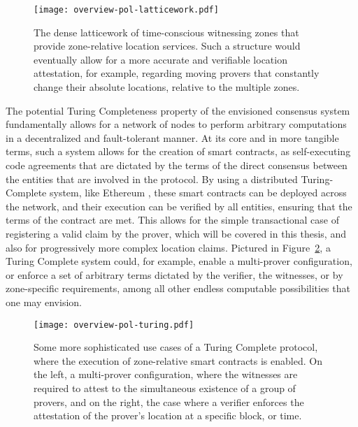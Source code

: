 \begin{figure}[ht]
    \begin{center}
    \texttt{[image: overview-pol-latticework.pdf]}
    \caption{The dense latticework of time-conscious witnessing zones that provide zone-relative location services. Such a structure would eventually allow for a more accurate and verifiable location attestation, for example, regarding moving provers that constantly change their absolute locations, relative to the multiple zones.}
    \label{fig:proof-of-location-overview-latticework}
    \end{center}
\end{figure}

The potential Turing Completeness property of the envisioned consensus system fundamentally allows for a network of nodes to perform arbitrary computations in a decentralized and fault-tolerant manner. At its core and in more tangible terms, such a system allows for the creation of smart contracts, as self-executing code agreements that are dictated by the terms of the direct consensus between the entities that are involved in the \pol{} protocol. By using a distributed Turing-Complete system, like Ethereum \cite{buterin2014next}, these smart contracts can be deployed across the network, and their execution can be verified by all entities, ensuring that the terms of the contract are met. This allows for the simple transactional case of registering a valid \pol{} claim by the prover, which will be covered in this thesis, and also for progressively more complex location claims. Pictured in Figure~\ref{fig:proof-of-location-overview-turing}, a Turing Complete system could, for example, enable a multi-prover configuration, or enforce a set of arbitrary terms dictated by the verifier, the witnesses, or by zone-specific requirements, among all other endless computable possibilities that one may envision. 

\begin{figure}[ht]
    \begin{center}
    \texttt{[image: overview-pol-turing.pdf]}
    \caption{Some more sophisticated use cases of a Turing Complete \pol{} protocol, where the execution of zone-relative smart contracts is enabled. On the left, a multi-prover configuration, where the witnesses are required to attest to the simultaneous existence of a group of provers, and on the right, the case where a verifier enforces the attestation of the prover's location at a specific block, or time.}
    \label{fig:proof-of-location-overview-turing}
    \end{center}
\end{figure}

